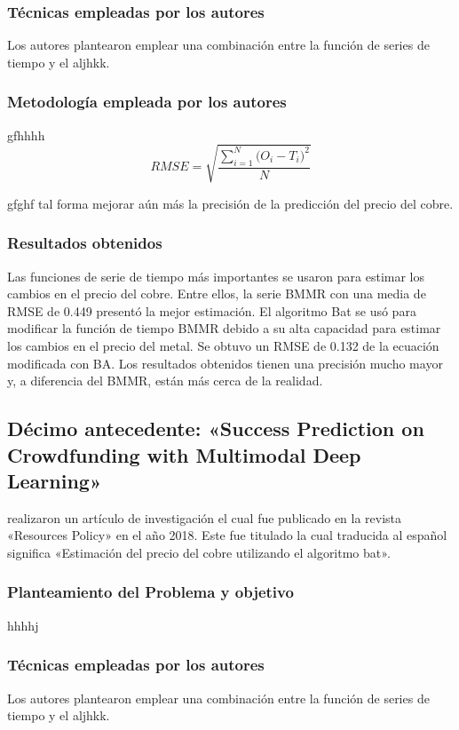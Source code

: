 \subsubsection{Técnicas empleadas por los autores}
Los autores plantearon emplear una combinación entre la función de series de tiempo y el aljhkk. 

\subsubsection{Metodología empleada por los autores}
gfhhhh
\begin{equation}  
\label{eq:RMSE}
RMSE = \sqrt{\frac{\sum_{i=1}^{N}{\Big(O_i -T_i\Big)^2}}{N}}
\end{equation}

gfghf tal forma mejorar aún más la precisión de la predicción del precio del cobre.

\subsubsection{Resultados obtenidos}
Las funciones de serie de tiempo más importantes se usaron para estimar los cambios en el precio del cobre. Entre ellos, la serie BMMR con una media de RMSE de 0.449 presentó la mejor estimación. El algoritmo Bat  se usó para modificar la función de tiempo BMMR debido a su alta capacidad para estimar los cambios en el precio del metal. Se obtuvo un RMSE de 0.132 de la ecuación modificada con BA. Los resultados obtenidos tienen una precisión mucho mayor y, a diferencia del BMMR, están más cerca de la realidad.


\subsection{Décimo antecedente: «Success Prediction on Crowdfunding with Multimodal Deep Learning» \citep*{pr_cheng2019deeplearning}}
\citeauthor{pr_cheng2019deeplearning} realizaron un artículo de investigación el cual fue publicado en la revista «Resources Policy» en el año 2018. Este fue titulado  la cual traducida al español significa «Estimación del precio del cobre utilizando el algoritmo bat».

\subsubsection{Planteamiento del Problema y objetivo }
hhhhj

\subsubsection{Técnicas empleadas por los autores}
Los autores plantearon emplear una combinación entre la función de series de tiempo y el aljhkk. 

